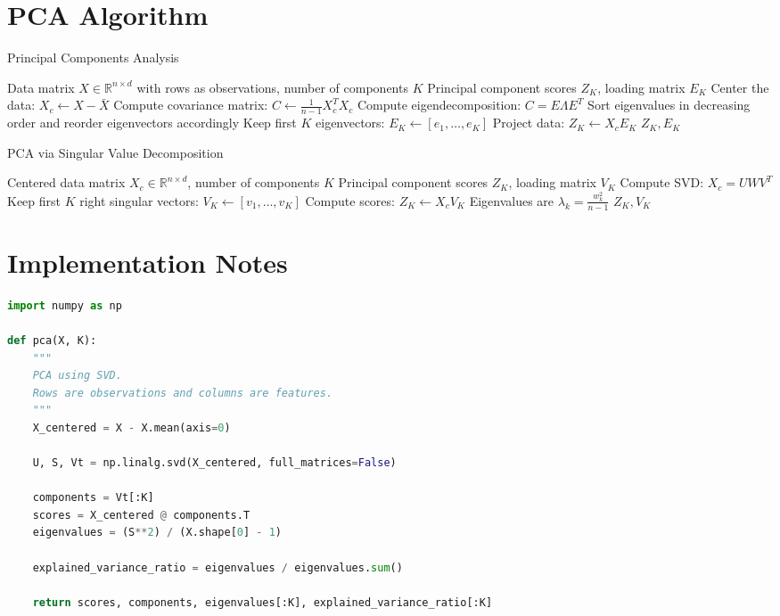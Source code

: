 \documentclass[12pt,oneside]{book}
\numberwithin{equation}{section}
\theoremstyle{definition}
\theoremstyle{plain}
\theoremstyle{remark}
\newcommand{\R}{\mathbb{R}}
\begin{document}
\section{PCA Algorithm}

\begin{algorithm}[H]
\caption{Principal Components Analysis}
\begin{algorithmic}[1]
\Require Data matrix $X \in \R^{n\times d}$ with rows as observations, number of components $K$
\Ensure Principal component scores $Z_K$, loading matrix $E_K$
\State Center the data: $X_c \gets X - \bar{X}$
\State Compute covariance matrix: $C \gets \frac{1}{n-1}X_c^TX_c$
\State Compute eigendecomposition: $C=E\Lambda E^T$
\State Sort eigenvalues in decreasing order and reorder eigenvectors accordingly
\State Keep first $K$ eigenvectors: $E_K \gets [e_1,\dots,e_K]$
\State Project data: $Z_K \gets X_cE_K$
\State \Return $Z_K, E_K$
\end{algorithmic}
\end{algorithm}

\begin{algorithm}[H]
\caption{PCA via Singular Value Decomposition}
\begin{algorithmic}[1]
\Require Centered data matrix $X_c \in \R^{n\times d}$, number of components $K$
\Ensure Principal component scores $Z_K$, loading matrix $V_K$
\State Compute SVD: $X_c=U W V^T$
\State Keep first $K$ right singular vectors: $V_K \gets [v_1,\dots,v_K]$
\State Compute scores: $Z_K \gets X_cV_K$
\State Eigenvalues are $\lambda_k = \frac{w_k^2}{n-1}$
\State \Return $Z_K,V_K$
\end{algorithmic}
\end{algorithm}

\section{Implementation Notes}

\begin{lstlisting}[language=Python]
import numpy as np

def pca(X, K):
    """
    PCA using SVD.
    Rows are observations and columns are features.
    """
    X_centered = X - X.mean(axis=0)

    U, S, Vt = np.linalg.svd(X_centered, full_matrices=False)

    components = Vt[:K]
    scores = X_centered @ components.T
    eigenvalues = (S**2) / (X.shape[0] - 1)

    explained_variance_ratio = eigenvalues / eigenvalues.sum()

    return scores, components, eigenvalues[:K], explained_variance_ratio[:K]
\end{lstlisting}
\end{document}
